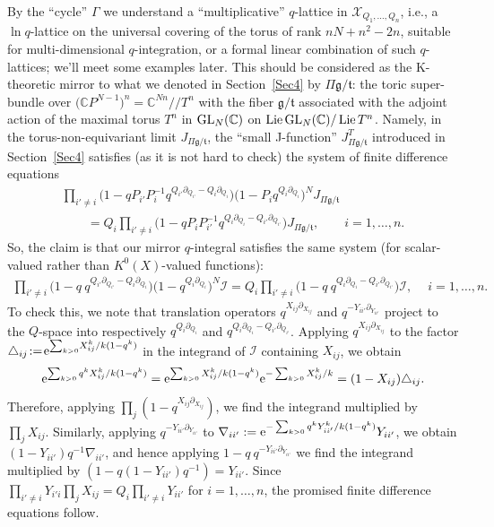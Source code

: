 \documentclass[pdftex]{sigma}
\numberwithin{equation}{section}
\def\I{\mathcal I}
\def\X{\mathcal X}
\def\CC{\mathbb C}
\def\p{\partial}
\def\Lie{\operatorname{Lie}}
\renewcommand{\Delta}{\triangle}
\begin{document}
By the ``cycle'' $\Gamma$ we understand a ``multiplicative'' $q$-lattice in $\X_{Q_1,\dots,Q_n}$, i.e., a $\ln q$-lattice on the universal covering of the torus of rank $nN+n^2-2n$, suitable for multi-dimensional $q$-integration, or a formal linear combination of such $q$-lattices; we'll meet some examples later. This should be considered as the K-theoretic mirror to what we denoted in Section~\ref{Sec4} by $\Pi \mathfrak{g}/\mathfrak{t}$: the toric super-bundle over $\big(\CC P^{N-1}\big)^n=\CC^{Nn}//T^n$ with the fiber $\mathfrak{g}/\mathfrak{t}$ associated with the adjoint action of the maximal torus $T^n$ in ${\rm GL}_N(\CC)$ on $\Lie {\rm GL}_N(\CC)/\Lie T^n$. Namely, in the torus-non-equivariant limit $J_{\Pi\mathfrak{g}/\mathfrak{t}}$, the ``small J-function'' $J^T_{\Pi \mathfrak{g}/\mathfrak{t}}$ introduced in Section~\ref{Sec4} satisfies (as it is not hard to check) the system of finite difference equations
\begin{gather*}
\prod_{i'\neq i}\big(1-q P_{i'}P_i^{-1}q^{Q_{i'}\p_{Q_{i'}}-Q_i\p_{Q_i}}\big)
\big(1-P_iq^{Q_i\p_{Q_i}}\big)^N J_{\Pi \mathfrak{g}/\mathfrak{t}}
\\ \qquad
{} = Q_i \prod_{i'\neq i} \big(1-q P_iP_{i'}^{-1} q^{Q_i\p_{Q_i}-Q_{i'}\p_{Q_{i'}}}\big) J_{\Pi \mathfrak{g}/\mathfrak{t}},\qquad i=1,\dots, n.
\end{gather*}
So, the claim is that our mirror $q$-integral satisfies the same system (for scalar-valued rather than $K^0(X)$-valued functions):
\begin{gather*}
 \prod_{i'\neq i}\big(1-q\ q^{Q_{i'}\p_{Q_{i'}}-Q_i\p_{Q_i}}\big) \big(1-q^{Q_i\p_{Q_i}}\big)^N \I
 = Q_i\prod_{i'\neq i} \big(1-q\ q^{Q_i\p_{Q_i}-Q_{i'}\p_{Q_{i'}}}\big)\I,\quad\ i=1,\dots, n.
\end{gather*}
To check this, we note that translation operators $q^{X_{ij}\p_{X_{ij}}}$ and $q^{-Y_{ii'}\p_{Y_{ii'}}}$ project to the $Q$-space into respectively $q^{Q_i\p_{Q_i}}$ and $q^{Q_i\p_{Q_i}\!-Q_{i'}\p_{Q_{i'}}}$\!. Applying $q^{X_{ij}\p_{X_{ij}}}$ to the factor $\Delta_{ij}\!:=\!{\rm e}^{\sum_{k>0}\!X_{ij}^k/k(1-q^k)}$ in the integrand of $\I$ containing $X_{ij}$, we obtain
\[
{\rm e}^{\sum_{k>0} q^kX_{ij}^k/k(1-q^k)}={\rm e}^{\sum_{k>0}X_{ij}^k/k(1-q^k)}{\rm e}^{-\sum_{k>0}X_{ij}^k/k}=(1-X_{ij}) \Delta_{ij}.
\]
Therefore, applying $\prod_j(1-q^{X_{ij}\p_{X_{ij}}})$, we find the integrand multiplied by $\prod_j X_{ij}$. Similarly, applying $q^{-Y_{ii'}\p_{Y_{ii'}}}$ to $\nabla_{ii'}:={\rm e}^{-\sum_{k>0}q^kY_{ii'}^{k}/k(1-q^k)}Y_{ii'}$,
we obtain $(1-Y_{ii'})q^{-1}\nabla_{ii'}$, and hence applying $1-q\ q^{-Y_{ii'}\p_{Y_{ii'}}}$ we find the integrand multiplied by $(1-q (1-Y_{ii'}) q^{-1})=Y_{ii'}$. Since $\prod_{i'\neq i}Y_{i'i}\prod_jX_{ij} =Q_i\prod_{i'\neq i} Y_{ii'}$ for $i=1,\dots, n$, the promised finite difference equations follow.
\end{document}
